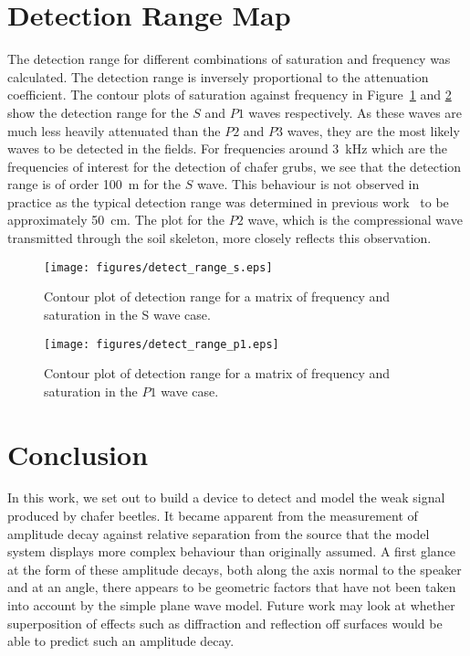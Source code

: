 \documentclass[twocolumn]{article}
\begin{document}
\section{Detection Range Map}
The detection range for different combinations of saturation and frequency was calculated. The detection range is inversely proportional to the attenuation coefficient. The contour plots of saturation against frequency in Figure~\ref{fig:detect_range_s} and \ref{fig:detect_range_p1} show the detection range for the $S$ and $P1$ waves respectively. As these waves are much less heavily attenuated than the $P2$ and $P3$ waves, they are the most likely waves to be detected in the fields. For frequencies around \SI{3}{\kHz} which are the frequencies of interest for the detection of chafer grubs, we see that the detection range is of order \SI{100}{\m} for the $S$ wave. This behaviour is not observed in practice as the typical detection range was determined in previous work~\cite{mankin_hubbard_weaver_2000} to be approximately \SI{50}{\cm}. The plot for the $P2$ wave, which is the compressional wave transmitted through the soil skeleton, more closely reflects this observation.

\begin{figure}
    \centering
    \texttt{[image: figures/detect\_range\_s.eps]}
    \caption{Contour plot of detection range for a matrix of frequency and saturation in the S wave case.}
    \label{fig:detect_range_s}
\end{figure}

\begin{figure}
    \centering
    \texttt{[image: figures/detect\_range\_p1.eps]}
    \caption{Contour plot of detection range for a matrix of frequency and saturation in the $P1$ wave case.}
    \label{fig:detect_range_p1}
\end{figure}


\section{Conclusion}
In this work, we set out to build a device to detect and model the weak signal produced by chafer beetles. It became apparent from the measurement of amplitude decay against relative separation from the source that the model system displays more complex behaviour than originally assumed. A first glance at the form of these amplitude decays, both along the axis normal to the speaker and at an angle, there appears to be geometric factors that have not been taken into account by the simple plane wave model. Future work may look at whether superposition of effects such as diffraction and reflection off surfaces would be able to predict such an amplitude decay.
\end{document}
